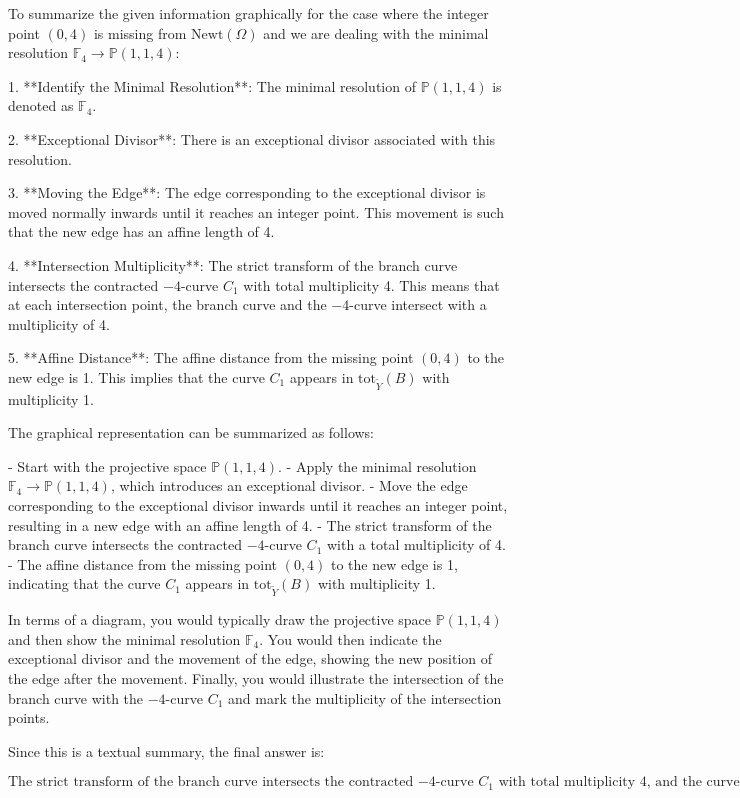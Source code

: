 To summarize the given information graphically for the case where the integer point \((0,4)\) is missing from \(\mathrm{Newt}(\Omega)\) and we are dealing with the minimal resolution \(\mathbb{F}_4 \to \mathbb{P}(1,1,4)\):

1. **Identify the Minimal Resolution**: The minimal resolution of \(\mathbb{P}(1,1,4)\) is denoted as \(\mathbb{F}_4\).

2. **Exceptional Divisor**: There is an exceptional divisor associated with this resolution.

3. **Moving the Edge**: The edge corresponding to the exceptional divisor is moved normally inwards until it reaches an integer point. This movement is such that the new edge has an affine length of 4.

4. **Intersection Multiplicity**: The strict transform of the branch curve intersects the contracted \(-4\)-curve \(C_1\) with total multiplicity 4. This means that at each intersection point, the branch curve and the \(-4\)-curve intersect with a multiplicity of 4.

5. **Affine Distance**: The affine distance from the missing point \((0,4)\) to the new edge is 1. This implies that the curve \(C_1\) appears in \(\mathrm{tot}_{\tilde{Y}}(B)\) with multiplicity 1.

The graphical representation can be summarized as follows:

- Start with the projective space \(\mathbb{P}(1,1,4)\).
- Apply the minimal resolution \(\mathbb{F}_4 \to \mathbb{P}(1,1,4)\), which introduces an exceptional divisor.
- Move the edge corresponding to the exceptional divisor inwards until it reaches an integer point, resulting in a new edge with an affine length of 4.
- The strict transform of the branch curve intersects the contracted \(-4\)-curve \(C_1\) with a total multiplicity of 4.
- The affine distance from the missing point \((0,4)\) to the new edge is 1, indicating that the curve \(C_1\) appears in \(\mathrm{tot}_{\tilde{Y}}(B)\) with multiplicity 1.

In terms of a diagram, you would typically draw the projective space \(\mathbb{P}(1,1,4)\) and then show the minimal resolution \(\mathbb{F}_4\). You would then indicate the exceptional divisor and the movement of the edge, showing the new position of the edge after the movement. Finally, you would illustrate the intersection of the branch curve with the \(-4\)-curve \(C_1\) and mark the multiplicity of the intersection points.

Since this is a textual summary, the final answer is:

\[
\boxed{\text{The strict transform of the branch curve intersects the contracted \(-4\)-curve \(C_1\) with total multiplicity 4, and the curve \(C_1\) appears in \(\mathrm{tot}_{\tilde{Y}}(B)\) with multiplicity 1.}}
\]